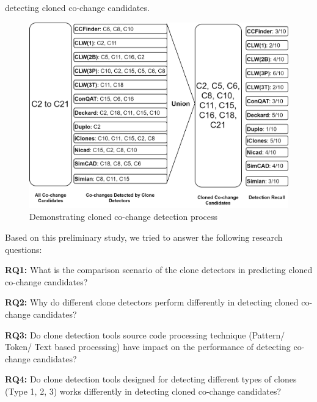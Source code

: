 \documentclass[review]{elsarticle}
\begin{document}
detecting cloned co-change candidates.


\vspace{4mm}
\begin{figure}
\centering
\includegraphics[width=\columnwidth] {CalculatingCC.png}
\caption{Demonstrating cloned co-change detection process}
\label{fig:CalculatingCC}
\end{figure}

Based on this preliminary study, we tried to answer the following research questions:

\vspace{0.15cm}
\noindent
\textbf{RQ1: }What is the comparison scenario of the clone detectors in predicting cloned co-change candidates?
 
\vspace{0.15cm}
\noindent
\textbf{RQ2: }Why do different clone detectors perform differently in detecting cloned co-change candidates?

\vspace{0.15cm}
\noindent
\textbf{RQ3: }Do clone detection tools source code processing technique (Pattern/ Token/ Text based processing) have impact on the performance of detecting co-change candidates?

\vspace{0.15cm}
\noindent
\textbf{RQ4: }Do clone detection tools designed for detecting different types of clones (Type 1, 2, 3) works differently in detecting cloned co-change candidates?
\end{document}
